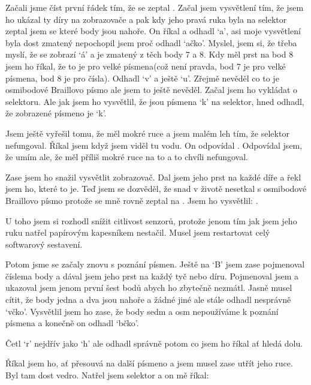 Začali jsme číst první řádek tím, že se zeptal .  Začal jsem vysvětlení tím, že jsem ho ukázal ty díry na zobrazovače a pak kdy jeho pravá ruka byla na selektor zeptal jsem se které body jsou nahoře.  On říkal  a odhadl `a', asi moje vysvětlení byla dost zmatený nepochopil jsem proč odhadl `ačko'.  Myslel, jsem si, že třeba myslí, že se zobrazí `á' a je zmatený z těch body 7 a 8.  Kdy měl prst na bod 8 jsem ho říkal, že to je pro velké písmena(což není pravda, bod 7 je pro velké písmena, bod 8 je pro čísla). Odhadl `v' a ještě `u'. Zřejmě nevěděl co to je osmibodové Braillovo písmo ale jsem to ještě nevěděl.  Začal jsem ho vykládat o selektoru.  Ale jak jsem ho vysvětlil, že jsou písmena `k' na selektor, hned odhadl, že zobrazené písmeno je `k'.

Jsem ještě vyřešil tomu, že měl mokré ruce a jsem malém leh tím, že selektor nefungoval.  Říkal jsem  když jsem viděl tu vodu.  On odpovídal .  Odpovídal jsem, že umím ale, že měl příliš mokré ruce na to a to chvíli nefungoval.

Zase jsem ho snažil vysvětlit zobrazovač.  Dal jsem jeho prst na každé díře a řekl jsem ho, které to je.  Teď jsem se dozvěděl, že snad v životě nesetkal s osmibodové Braillovo písmo protože se mně rovně zeptal na .  Jsem ho vysvětlil: .

U toho jsem si rozhodl snížit citlivost senzorů, protože jenom tím jak jsem jeho ruku natřel papírovým kapesníkem nestačil.  Musel jsem restartovat celý softwarový sestavení.

Potom jsme se začaly znovu s poznání písmen.  Ještě na `B' jsem zase pojmenoval číslema body a dával jsem jeho prst na každý tyč nebo díru. Pojmenoval jsem a ukazoval jsem jenom první šest bodů abych ho zbytečně nezmátl.  Jasně musel cítit, že body jedna a dva jsou nahoře a žádné jiné ale stále odhadl nesprávně `včko'.  Vysvětlil jsem ho zase, že body sedm a osm nepoužíváme k poznání písmena a konečně on odhadl `bčko'.

Četl `r' nejdřív jako `h' ale odhadl správně potom co jsem ho říkal ať hledá dolu.

Říkal jsem ho, ať přesouvá na další písmeno a jsem musel zase utřít jeho ruce.  Byl tam dost vedro.  Natřel jsem selektor a on mě říkal: 

